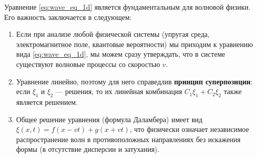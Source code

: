 \begin{remark}
Уравнение \eqref{eq:wave_eq_1d} является фундаментальным для волновой физики. Его важность заключается в следующем:
\begin{enumerate}
    \item Если при анализе любой физической системы (упругая среда, электромагнитное поле, квантовые вероятности) мы приходим к уравнению вида \eqref{eq:wave_eq_1d}, мы можем сразу утверждать, что в системе существуют волновые процессы со скоростью $v$.
    \item Уравнение линейно, поэтому для него справедлив \textbf{принцип суперпозиции}: если $\xi_1$ и $\xi_2$ --- решения, то их линейная комбинация $C_1\xi_1 + C_2\xi_2$ также является решением.
    \item Общее решение уравнения (формула Даламбера) имеет вид $\xi(x,t) = f(x-vt) + g(x+vt)$, что физически означает независимое распространение волн в противоположных направлениях без искажения формы (в отсутствие дисперсии и затухания).
\end{enumerate}
\end{remark}
